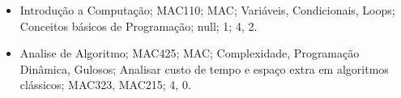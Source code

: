 \documentclass{report}
\begin{document}
\begin{itemize}
  \item Introdução a Computação; MAC110; MAC; Variáveis, Condicionais, Loops; Conceitos básicos de Programação; null; 1; 4, 2.
  \item Analise de Algoritmo; MAC425; MAC; Complexidade, Programação Dinâmica, Gulosos; Analisar custo de tempo e espaço extra em algoritmos clássicos; MAC323, MAC215; 4, 0.
\end{itemize}
%     
%
%
\end{document}
